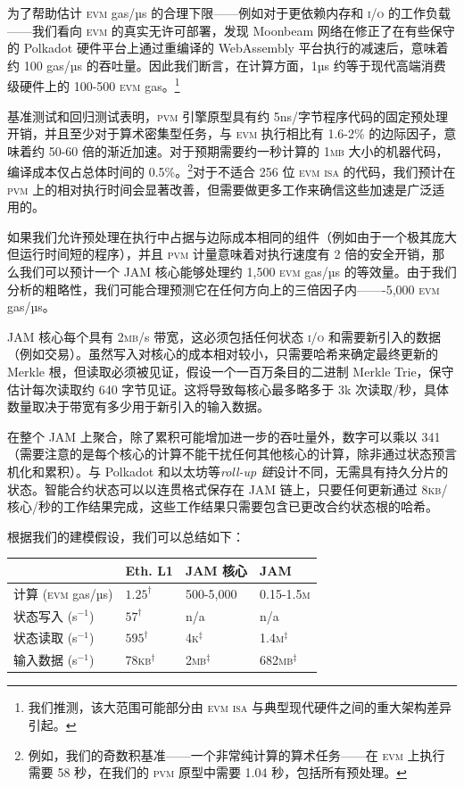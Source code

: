 为了帮助估计 \textsc{evm} gas/µs 的合理下限——例如对于更依赖内存和 \textsc{i/o} 的工作负载——我们看向 \textsc{evm} 的真实无许可部署，发现 Moonbeam 网络在修正了在有些保守的 Polkadot 硬件平台上通过重编译的 WebAssembly 平台执行的减速后，意味着约 100 gas/µs 的吞吐量。因此我们断言，在计算方面，1µs 约等于现代高端消费级硬件上的 100-500 \textsc{evm} gas。\footnote{我们推测，该大范围可能部分由 \textsc{evm} \textsc{isa} 与典型现代硬件之间的重大架构差异引起。}

基准测试和回归测试表明，\textsc{pvm} 引擎原型具有约 5ns/字节程序代码的固定预处理开销，并且至少对于算术密集型任务，与 \textsc{evm} 执行相比有 1.6-2\% 的边际因子，意味着约 50-60 倍的渐近加速。对于预期需要约一秒计算的 1\textsc{mb} 大小的机器代码，编译成本仅占总体时间的 0.5\%。\footnote{例如，我们的奇数积基准——一个非常纯计算的算术任务——在 \textsc{evm} 上执行需要 58 秒，在我们的 \textsc{pvm} 原型中需要 1.04 秒，包括所有预处理。}对于不适合 256 位 \textsc{evm} \textsc{isa} 的代码，我们预计在 \textsc{pvm} 上的相对执行时间会显著改善，但需要做更多工作来确信这些加速是广泛适用的。

如果我们允许预处理在执行中占据与边际成本相同的组件（例如由于一个极其庞大但运行时间短的程序），并且 \textsc{pvm} 计量意味着对执行速度有 2 倍的安全开销，那么我们可以预计一个 JAM 核心能够处理约 1,500 \textsc{evm} gas/µs 的等效量。由于我们分析的粗略性，我们可能合理预测它在任何方向上的三倍因子内——-5,000 \textsc{evm} gas/µs。

JAM 核心每个具有 2\textsc{mb}/s 带宽，这必须包括任何状态 \textsc{i/o} 和需要新引入的数据（例如交易）。虽然写入对核心的成本相对较小，只需要哈希来确定最终更新的 Merkle 根，但读取必须被见证，假设一个一百万条目的二进制 Merkle Trie，保守估计每次读取约 640 字节见证。这将导致每核心最多略多于 3k 次读取/秒，具体数量取决于带宽有多少用于新引入的输入数据。

在整个 JAM 上聚合，除了累积可能增加进一步的吞吐量外，数字可以乘以 341（需要注意的是每个核心的计算不能干扰任何其他核心的计算，除非通过状态预言机化和累积）。与 Polkadot 和以太坊等\emph{roll-up 链}设计不同，无需具有持久分片的状态。智能合约状态可以以连贯格式保存在 JAM 链上，只要任何更新通过 8\textsc{kb}/核心/秒的工作结果完成，这些工作结果只需要包含已更改合约状态根的哈希。

根据我们的建模假设，我们可以总结如下：
\begin{center}
  \begin{tabular}[h]{@{}llll@{}}
    \toprule
    & Eth. L1 & JAM 核心 & JAM \\
    \midrule
    计算 (\textsc{evm} gas/µs) & $1.25^\dagger$ & 500-5,000 & 0.15-1.5\textsc{m} \\
    状态写入 (s$^{-1}$) & $57^\dagger$ & n/a & n/a \\
    状态读取 (s$^{-1}$) & $595^\dagger$ & 4\textsc{k}${}^\ddagger$ & 1.4\textsc{m}${}^\ddagger$ \\
    输入数据 (s$^{-1}$) & 78\textsc{kb}${}^\dagger$ & 2\textsc{mb}${}^\ddagger$ & 682\textsc{mb}${}^\ddagger$ \\
    \bottomrule
  \end{tabular}
\end{center}

